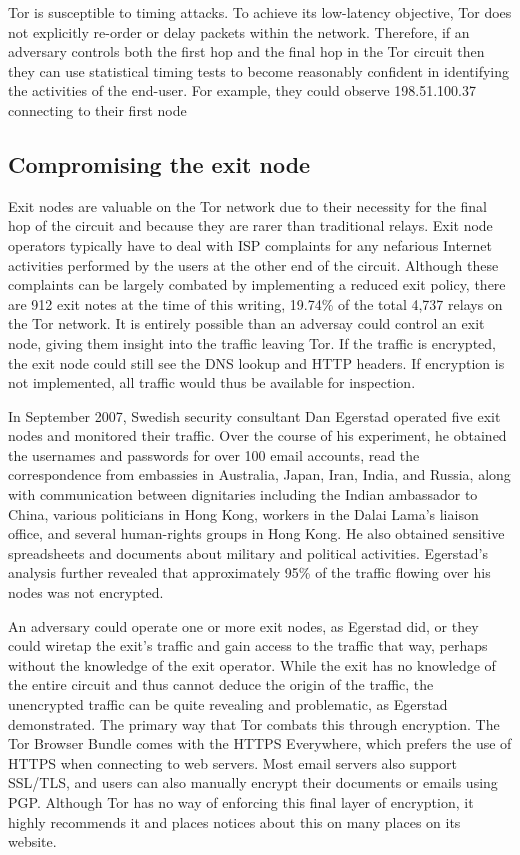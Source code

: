 \documentclass[journal]{IEEEtran}
\begin{document}
Tor is susceptible to timing attacks. To achieve its low-latency objective, Tor does not explicitly re-order or delay packets within the network.\cite{McCoy2008} Therefore, if an adversary controls both the first hop and the final hop in the Tor circuit then they can use statistical timing tests to become reasonably confident in identifying the activities of the end-user. For example, they could observe 198.51.100.37 connecting to their first node



\subsection{Compromising the exit node}

Exit nodes are valuable on the Tor network due to their necessity for the final hop of the circuit and because they are rarer than traditional relays. Exit node operators typically have to deal with ISP complaints for any nefarious Internet activities performed by the users at the other end of the circuit. Although these complaints can be largely combated by implementing a reduced exit policy, there are 912 exit notes at the time of this writing, 19.74\% of the total 4,737 relays on the Tor network. It is entirely possible than an adversay could control an exit node, giving them insight into the traffic leaving Tor. If the traffic is encrypted, the exit node could still see the DNS lookup and HTTP headers. If encryption is not implemented, all traffic would thus be available for inspection.

In September 2007, Swedish security consultant Dan Egerstad operated five exit nodes and monitored their traffic. Over the course of his experiment, he obtained the usernames and passwords for over 100 email accounts, read the correspondence from embassies in Australia, Japan, Iran, India, and Russia, along with communication between dignitaries including the Indian ambassador to China, various politicians in Hong Kong, workers in the Dalai Lama's liaison office, and several human-rights groups in Hong Kong. He also obtained sensitive spreadsheets and documents about military and political activities. Egerstad's analysis further revealed that approximately 95\% of the traffic flowing over his nodes was not encrypted.\cite{Wired2007}

An adversary could operate one or more exit nodes, as Egerstad did, or they could wiretap the exit's traffic and gain access to the traffic that way, perhaps without the knowledge of the exit operator. While the exit has no knowledge of the entire circuit and thus cannot deduce the origin of the traffic, the unencrypted traffic can be quite revealing and problematic, as Egerstad demonstrated. The primary way that Tor combats this through encryption. The Tor Browser Bundle comes with the HTTPS Everywhere, which prefers the use of HTTPS when connecting to web servers. Most email servers also support SSL/TLS, and users can also manually encrypt their documents or emails using PGP. Although Tor has no way of enforcing this final layer of encryption, it highly recommends it and places notices about this on many places on its website.
\end{document}

